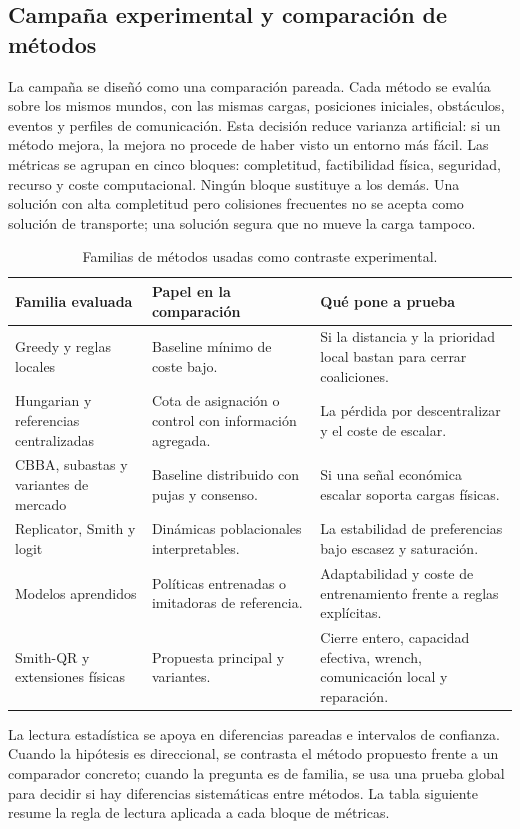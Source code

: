 \subsection{Campaña experimental y comparación de métodos}

La campaña se diseñó como una comparación pareada. Cada método se evalúa sobre los mismos
mundos, con las mismas cargas, posiciones iniciales, obstáculos, eventos y perfiles de
comunicación. Esta decisión reduce varianza artificial: si un método mejora, la mejora no
procede de haber visto un entorno más fácil. Las métricas se agrupan en cinco bloques:
completitud, factibilidad física, seguridad, recurso y coste computacional. Ningún bloque
sustituye a los demás. Una solución con alta completitud pero colisiones frecuentes no se
acepta como solución de transporte; una solución segura que no mueve la carga tampoco.

\begin{table}[H]
\centering
\scriptsize
\begin{tabularx}{\textwidth}{@{}p{}p{}X@{}}
\toprule
Familia evaluada & Papel en la comparación & Qué pone a prueba \\
\midrule
Greedy y reglas locales & Baseline mínimo de coste bajo. & Si la distancia y la prioridad local bastan para cerrar coaliciones. \\
Hungarian y referencias centralizadas & Cota de asignación o control con información agregada. & La pérdida por descentralizar y el coste de escalar. \\
CBBA, subastas y variantes de mercado & Baseline distribuido con pujas y consenso. & Si una señal económica escalar soporta cargas físicas. \\
Replicator, Smith y logit & Dinámicas poblacionales interpretables. & La estabilidad de preferencias bajo escasez y saturación. \\
Modelos aprendidos & Políticas entrenadas o imitadoras de referencia. & Adaptabilidad y coste de entrenamiento frente a reglas explícitas. \\
Smith-QR y extensiones físicas & Propuesta principal y variantes. & Cierre entero, capacidad efectiva, wrench, comunicación local y reparación. \\
\bottomrule
\end{tabularx}
\caption{Familias de métodos usadas como contraste experimental.}
\label{tab:familias-metodos-exp}
\end{table}

La lectura estadística se apoya en diferencias pareadas e intervalos de confianza. Cuando
la hipótesis es direccional, se contrasta el método propuesto frente a un comparador
concreto; cuando la pregunta es de familia, se usa una prueba global para decidir si hay
diferencias sistemáticas entre métodos. La tabla siguiente resume la regla de lectura
aplicada a cada bloque de métricas.

